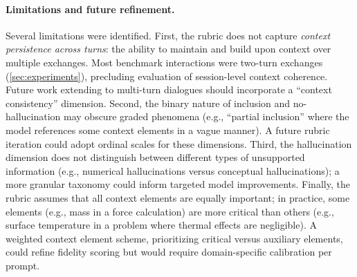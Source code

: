 \paragraph{Limitations and future refinement.} Several limitations were identified. First, the rubric does not capture \textit{context persistence across turns}: the ability to maintain and build upon context over multiple exchanges. Most benchmark interactions were two-turn exchanges (\cref{sec:experiments}), precluding evaluation of session-level context coherence. Future work extending to multi-turn dialogues should incorporate a ``context consistency'' dimension. Second, the binary nature of inclusion and no-hallucination may obscure graded phenomena (e.g., ``partial inclusion'' where the model references some context elements in a vague manner). A future rubric iteration could adopt ordinal scales for these dimensions. Third, the hallucination dimension does not distinguish between different types of unsupported information (e.g., numerical hallucinations versus conceptual hallucinations); a more granular taxonomy could inform targeted model improvements. Finally, the rubric assumes that all context elements are equally important; in practice, some elements (e.g., mass in a force calculation) are more critical than others (e.g., surface temperature in a problem where thermal effects are negligible). A weighted context element scheme, prioritizing critical versus auxiliary elements, could refine fidelity scoring but would require domain-specific calibration per prompt.
